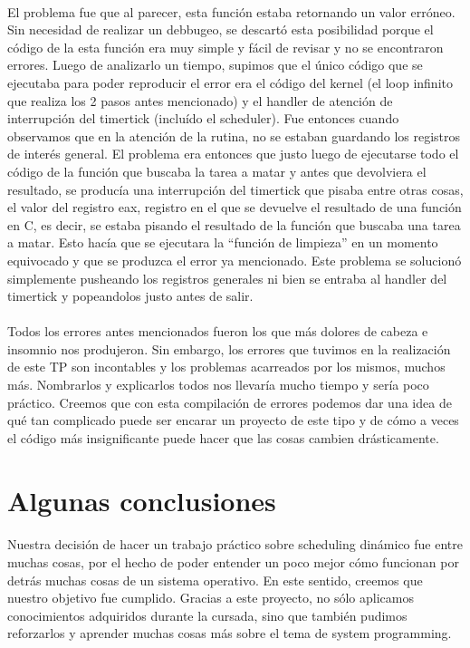 \documentclass[11pt, a4paper]{article}
\begin{document}
	\paragraph{}
	El problema fue que al parecer, esta función estaba retornando un valor erróneo. Sin necesidad de realizar un debbugeo, se descartó esta posibilidad porque el código de la esta función era muy simple y fácil de revisar y no se encontraron errores. Luego de analizarlo un tiempo, supimos que el único código que se ejecutaba para poder reproducir el error era el código del kernel (el loop infinito que realiza los 2 pasos antes mencionado) y el handler de atención de interrupción del timertick (incluído el scheduler). Fue entonces cuando observamos que en la atención de la rutina, no se estaban guardando los registros de interés general. El problema era entonces que justo luego de ejecutarse todo el código de la función que buscaba la tarea a matar y antes que devolviera el resultado, se producía una interrupción del timertick que pisaba entre otras cosas, el valor del registro eax, registro en el que se devuelve el resultado de una función en C, es decir, se estaba pisando el resultado de la función que buscaba una tarea a matar. Esto hacía que se ejecutara la ``función de limpieza'' en un momento equivocado y que se produzca el error ya mencionado. Este problema se solucionó simplemente pusheando los registros generales ni bien se entraba al handler del timertick y popeandolos justo antes de salir.

	\paragraph{}
	Todos los errores antes mencionados fueron los que más dolores de cabeza e insomnio nos produjeron. Sin embargo, los errores que tuvimos en la realización de este TP son incontables y los problemas acarreados por los mismos, muchos más. Nombrarlos y explicarlos todos nos llevaría mucho tiempo y sería poco práctico. Creemos que con esta compilación de errores podemos dar una idea de qué tan complicado puede ser encarar un proyecto de este tipo y de cómo a veces el código más insignificante puede hacer que las cosas cambien drásticamente.


\section{Algunas conclusiones}
	\paragraph{}
	Nuestra decisión de hacer un trabajo práctico sobre scheduling dinámico fue entre muchas cosas, por el hecho de poder entender un poco mejor cómo funcionan por detrás muchas cosas de un sistema operativo. En este sentido, creemos que nuestro objetivo fue cumplido. Gracias a este proyecto, no sólo aplicamos conocimientos adquiridos durante la cursada, sino que también pudimos reforzarlos y aprender muchas cosas más sobre el tema de system programming. 
\end{document}
